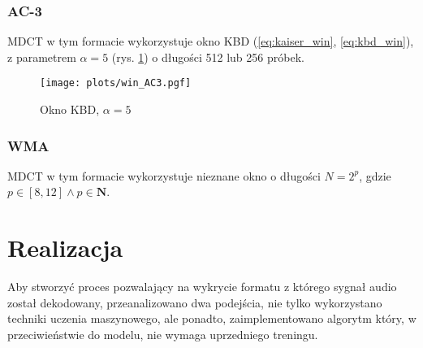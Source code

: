 \documentclass[pl,12pt]{aghdpl}
\let\Oldchapter\chapter%
\renewcommand{\chapter}{\FloatBarrier\Oldchapter}
\let\Oldsubsection\subsection%
\renewcommand{\subsection}{\FloatBarrier\Oldsubsection}
\begin{document}
\subsection{AC-3}

MDCT w tym formacie wykorzystuje okno KBD (\ref{eq:kaiser_win},
\ref{eq:kbd_win}), z parametrem $\alpha = 5$ (rys. \ref{fig:win_AC3}) o
długości 512 lub 256 próbek.
\begin{figure}[!tbh]
  \centering
  \texttt{[image: plots/win\_AC3.pgf]}
  \caption{Okno KBD, $\alpha = 5$}
  \label{fig:win_AC3}
\end{figure}

\subsection{WMA}

MDCT w tym formacie wykorzystuje nieznane okno o długości $N = 2^p$, gdzie $p
\in [8,12] \land p \in\bm N$.

\chapter{Realizacja}
Aby stworzyć proces pozwalający na wykrycie formatu z którego sygnał audio
został dekodowany, przeanalizowano dwa podejścia, nie tylko wykorzystano
techniki uczenia maszynowego, ale ponadto, zaimplementowano algorytm który, w
przeciwieństwie do modelu, nie wymaga uprzedniego treningu.
\end{document}
